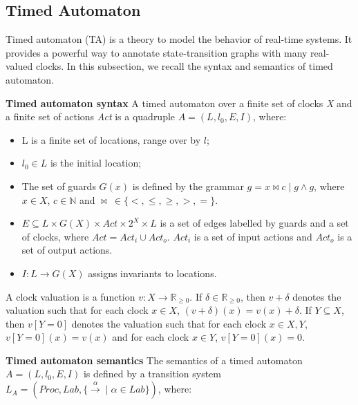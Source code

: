 \subsection{Timed Automaton}
Timed automaton (TA) \cite{BehrmannDLHPYH06} is a theory to model the behavior of real-time systems. It provides a powerful way to annotate state-transition graphs with many real-valued clocks. In this subsection, we recall the syntax and semantics of timed automaton. 
\begin{definition}
\textbf{Timed automaton syntax}
A timed automaton over a finite set of clocks \emph{X} and a finite set of actions \emph{Act} is a quadruple $\textit{A}=(L,l_{0},E,I)$, where:
\end{definition}
\begin{itemize}
\item
L is a finite set of locations, range over by $l$;
\item
$l_{0} \in  L$ is the initial location;
\item
The set of guards $G(x)$ is defined by the grammar $g = x \bowtie c \mid g \land g$, where $x \in X$, $c \in \mathbb{N}$ and $\bowtie~\in \{<,\leqslant,\geqslant,>,=\}$. 
\item
$E \subseteq L \times G(X) \times Act \times 2^X \times L$ is a set of edges labelled by guards and a set of clocks, where $Act = Act_{i} \cup Act_{o}$. $Act_{i}$ is a set of input actions and $Act_{o}$ is a set of output actions.
\item
$I : L \rightarrow G(X)$ assigns invariants to locations.
\end{itemize}
A clock valuation is a function $v : X \rightarrow \mathbb{R}_{\geqslant{0}}$. If $\delta \in \mathbb{R}_{\geqslant{0}}$, then $v + \delta$ denotes the valuation such that for each clock $x \in X$, $(v + \delta)(x) = v(x) + \delta$. If $Y \subseteq X$, then $v[Y = 0]$ denotes the valuation such that for each clock $x \in X, Y$, $v[Y = 0](x) = v(x)$ and for each clock $x \in Y$, $v[Y = 0](x) = 0$.
\begin{definition}
\textbf{Timed automaton semantics} 
The semantics of a timed automaton $\textit{A}=(L,l_{0},E,I)$ is defined by a transition system $L_{\textit{A}} = (Proc,Lab,\lbrace {{\xrightarrow{\alpha}}} \mid \alpha \in Lab \rbrace)$, where:
\end{definition}

